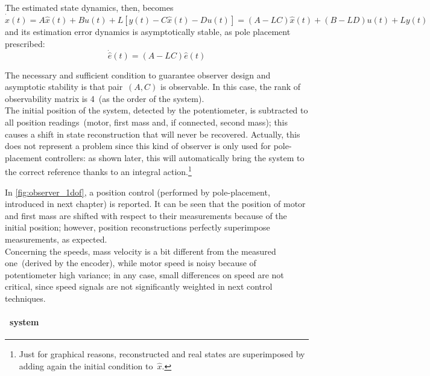 The estimated state dynamics, then, becomes
\begin{equation}
	\dot{\hat{x}}(t) = A\hat{x}(t) + Bu(t) + L [y(t) - C\hat{x}(t) - Du(t)] = (A-LC)\hat{x}(t) + (B-LD)u(t) + Ly(t)
	\label{eqn:est_state_dyn}
\end{equation}
and its estimation error dynamics is asymptotically stable, as pole placement prescribed:
\begin{equation}
	\dot{\hat{e}} (t) = (A-LC) \hat{e} (t)
\end{equation}

The necessary and sufficient condition to guarantee observer design and asymptotic stability is that pair~$(A,C)$ is observable. In this case, the rank of observability matrix is 4~(as the order of the system). \\

The initial position of the system, detected by the potentiometer, is subtracted to all position readings~(motor, first mass and, if connected, second mass); this causes a shift in state reconstruction that will never be recovered. Actually, this does not represent a problem since this kind of observer is only used for pole-placement controllers: as shown later, this will automatically bring the system to the correct reference thanks to an integral action.\footnote{Just for graphical reasons, reconstructed and real states are superimposed by adding again the initial condition to~$\hat x$.}

In \cref{fig:observer_1dof}, a position control (performed by pole-placement, introduced in next chapter) is reported. It can be seen that the position of motor and first mass are shifted with respect to their measurements because of the initial position; however, position reconstructions perfectly superimpose measurements, as expected.\\
Concerning the speeds, mass velocity is a bit different from the measured one~(derived by the encoder), while motor speed is noisy because of potentiometer high variance; in any case, small differences on speed are not critical, since speed signals are not significantly weighted in next control techniques.

\paragraph{\twodof\ system}


